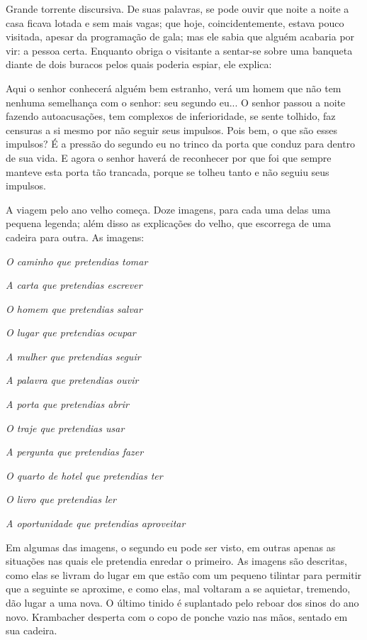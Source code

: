 Grande torrente discursiva. De suas palavras, se pode ouvir que noite a
noite a casa ficava lotada e sem mais vagas; que hoje, coincidentemente,
estava pouco visitada, apesar da programação de gala; mas ele sabia que
alguém acabaria por vir: a pessoa certa. Enquanto obriga o visitante a
sentar-se sobre uma banqueta diante de dois buracos pelos quais poderia
espiar, ele explica:

Aqui o senhor conhecerá alguém bem estranho, verá um homem que não tem
nenhuma semelhança com o senhor: seu segundo eu... O senhor passou a
noite fazendo autoacusações, tem complexos de inferioridade, se sente
tolhido, faz censuras a si mesmo por não seguir seus impulsos. Pois bem,
o que são esses impulsos? É a pressão do segundo eu no trinco da porta
que conduz para dentro de sua vida. E agora o senhor haverá de
reconhecer por que foi que sempre manteve esta porta tão trancada,
porque se tolheu tanto e não seguiu seus impulsos.

A viagem pelo ano velho começa. Doze imagens, para cada uma delas uma
pequena legenda; além disso as explicações do velho, que escorrega de
uma cadeira para outra. As imagens:

\emph{O caminho que pretendias tomar }

\emph{A carta que pretendias escrever }

\emph{O homem que pretendias salvar }

\emph{O lugar que pretendias ocupar }

\emph{A mulher que pretendias seguir }

\emph{A palavra que pretendias ouvir }

\emph{A porta que pretendias abrir }

\emph{O traje que pretendias usar }

\emph{A pergunta que pretendias fazer }

\emph{O quarto de hotel que pretendias ter }

\emph{O livro que pretendias ler }

\emph{A oportunidade que pretendias aproveitar }

Em algumas das imagens, o segundo eu pode ser visto, em outras apenas as
situações nas quais ele pretendia enredar o primeiro. As imagens são
descritas, como elas se livram do lugar em que estão com um pequeno
tilintar para permitir que a seguinte se aproxime, e como elas, mal
voltaram a se aquietar, tremendo, dão lugar a uma nova. O último tinido
é suplantado pelo reboar dos sinos do ano novo. Krambacher desperta com
o copo de ponche vazio nas mãos, sentado em sua cadeira.


